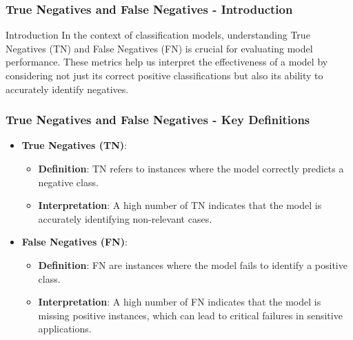\documentclass[aspectratio=169]{beamer}
\begin{document}
\begin{frame}[fragile]
  \frametitle{True Negatives and False Negatives - Introduction}
  \begin{block}{Introduction}
    In the context of classification models, understanding True Negatives (TN) and False Negatives (FN) is crucial for evaluating model performance. These metrics help us interpret the effectiveness of a model by considering not just its correct positive classifications but also its ability to accurately identify negatives.
  \end{block}
\end{frame}

\begin{frame}[fragile]
  \frametitle{True Negatives and False Negatives - Key Definitions}
  \begin{itemize}
    \item \textbf{True Negatives (TN)}:
      \begin{itemize}
        \item \textbf{Definition}: TN refers to instances where the model correctly predicts a negative class.
        \item \textbf{Interpretation}: A high number of TN indicates that the model is accurately identifying non-relevant cases.
      \end{itemize}
    
    \item \textbf{False Negatives (FN)}:
      \begin{itemize}
        \item \textbf{Definition}: FN are instances where the model fails to identify a positive class.
        \item \textbf{Interpretation}: A high number of FN indicates that the model is missing positive instances, which can lead to critical failures in sensitive applications.
      \end{itemize}
  \end{itemize}
\end{frame}
\end{document}
